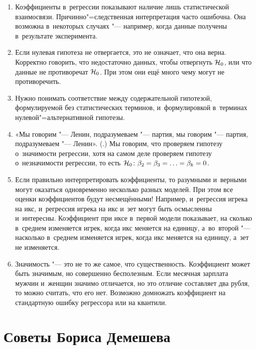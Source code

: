 \documentclass[final,pdftex]{../../template/epsilonj}
\begin{document}
\begin{enumerate}
	\item Коэффициенты в~регрессии показывают наличие лишь статистической взаимосвязи. Причинно"=следственная интерпретация часто ошибочна. Она возможна в~некоторых случаях "--- например, когда данные получены в~результате эксперимента.
	\item Если нулевая гипотеза не отвергается, это не означает, что она верна. Корректно говорить, что недостаточно данных, чтобы отвергнуть $\mathcal{H}_0$, или что данные не противоречат $\mathcal{H}_0$. При этом они ещё много чему могут не противоречить.
	\item Нужно понимать соответствие между содержательной гипотезой, формулируемой без статистических терминов, и~формулировкой в~терминах нулевой"=альтернативной гипотезы. 
	\item «Мы говорим "--- Ленин, подразумеваем "--- партия, мы говорим "--- партия, подразумеваем "--- Ленин». (\cite{mayakovskiy}.) Мы говорим, что проверяем гипотезу о~значимости регрессии, хотя на самом деле проверяем гипотезу о~незначимости регрессии, то есть $\mathcal{H}_0\colon \beta_2=\beta_3=\ldots=\beta_k=0$. 
	\item Если правильно интерпретировать коэффициенты, то разумными и~верными могут оказаться одновременно несколько разных моделей. При этом все оценки коэффициентов будут несмещёнными! Например, и~регрессия игрека на икс, и~регрессия игрека на икс и~зет могут быть осмысленны и~интересны. Коэффициент при иксе в~первой модели показывает, на сколько в~среднем изменяется игрек, когда икс меняется на единицу, а~во~второй "--- насколько в~среднем изменяется игрек, когда икс меняется на единицу, а~зет не изменяется.
	\item Значимость "--- это не то же самое, что существенность. Коэффициент может быть значимым, но совершенно бесполезным. Если месячная зарплата мужчин и~женщин значимо отличается, но это отличие составляет два рубля, то можно считать, что его нет. Возможно домножать коэффициент на стандартную ошибку регрессора или на квантили.
\end{enumerate}

\section{Советы Бориса Демешева}
\end{document}
